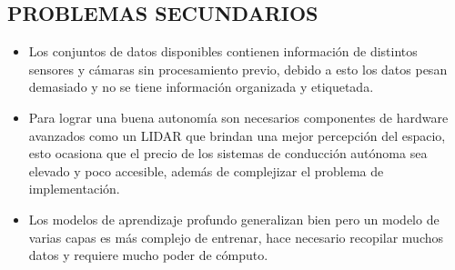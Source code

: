 \subsection{PROBLEMAS SECUNDARIOS}
\begin{itemize}[nosep]
	\item Los conjuntos de datos disponibles contienen información de distintos sensores y cámaras sin procesamiento previo, debido a esto los datos pesan demasiado y no se tiene información organizada y etiquetada.
	
	\item Para lograr una buena autonomía son necesarios componentes de hardware avanzados como un LIDAR que brindan una mejor percepción del espacio, esto ocasiona que el precio de los sistemas de conducción autónoma sea elevado y poco accesible, además de complejizar el problema de implementación.
	
	\item Los modelos de aprendizaje profundo generalizan bien pero un modelo de varias capas es más complejo de entrenar, hace necesario recopilar muchos datos y requiere mucho poder de cómputo.
	

\end{itemize}

